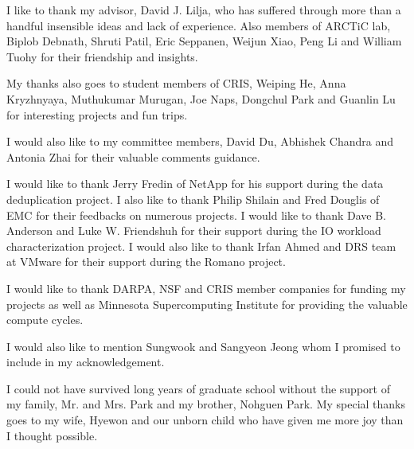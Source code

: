 
I like to thank my advisor, David J. Lilja, who has suffered through more than a handful insensible ideas and lack of experience. Also members of ARCTiC lab, Biplob Debnath, Shruti Patil, Eric Seppanen, Weijun Xiao, Peng Li and William Tuohy for their friendship and insights. 

My thanks also goes to student members of CRIS, Weiping He, Anna Kryzhnyaya, Muthukumar Murugan, Joe Naps, Dongchul Park and Guanlin Lu for interesting projects and fun trips. 

I would also like to my committee members, David Du, Abhishek Chandra and Antonia Zhai for their valuable comments guidance. 
 
I would like to thank Jerry Fredin of NetApp for his support during the data deduplication project. 
I also like to thank Philip Shilain and Fred Douglis of EMC for their feedbacks on numerous projects. 
I would like to thank Dave B. Anderson and Luke W. Friendshuh for their support during the IO workload characterization project.
I would also like to thank Irfan Ahmed and DRS team at VMware for their support during the Romano project. 

I would like to thank DARPA, NSF and CRIS member companies for funding my projects as well as Minnesota Supercomputing Institute for providing the valuable compute cycles. 

I would also like to mention Sungwook and Sangyeon Jeong whom I promised to include in my acknowledgement. 

I could not have survived long years of graduate school without the support of my family, Mr. and Mrs. Park and my brother, Nohguen Park.
My special thanks goes to my wife, Hyewon and our unborn child who have given me more joy than I thought possible.  

